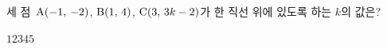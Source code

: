 세 점~$\mathrm{A}(-1,\,-2)$, $\mathrm{B}(1,\,4)$, $\mathrm{C}(3,\,3k-2)$가 한 직선 위에 있도록 하는 $k$의 값은?
\begin{choices32}{$1$}{$2$}{$3$}{$4$}{$5$}\end{choices32}
